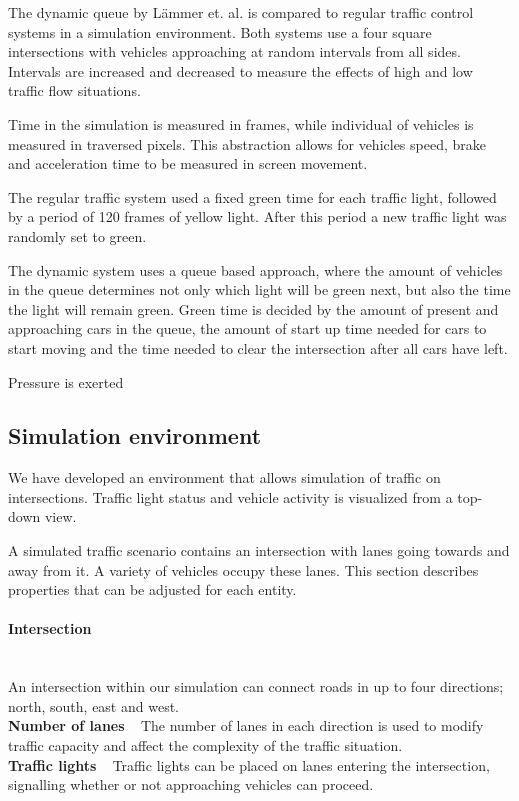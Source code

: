 \documentclass{article}
\begin{document}
The dynamic queue by L{\"a}mmer et. al. is compared to regular traffic control systems in a simulation environment. Both systems use a four square intersections with vehicles approaching at random intervals from all sides. Intervals are increased and decreased to measure the effects of high and low traffic flow situations. 

Time in the simulation is measured in frames, while individual of vehicles is measured in traversed pixels. This abstraction allows for vehicles speed, brake and acceleration time to be measured in screen movement.

The regular traffic system used a fixed green time for each traffic light, followed by a period of 120 frames of yellow light. After this period a new traffic light was randomly set to green.

The dynamic system uses a queue based approach, where the amount of vehicles in the queue determines not only which light will be green next, but also the time the light will remain green. Green time is decided by the amount of present and approaching cars in the queue, the amount of start up time needed for cars to start moving and the time needed to clear the intersection after all cars have left. 

Pressure is exerted 


\subsection{Simulation environment}
We have developed an environment that allows simulation of traffic on intersections. Traffic light status and vehicle activity is visualized from a top-down view.

A simulated traffic scenario contains an intersection with lanes going towards and away from it. A variety of vehicles occupy these lanes. This section describes properties that can be adjusted for each entity.

\paragraph{Intersection} ~\\
An intersection within our simulation can connect roads in up to four directions; north, south, east and west. \\
\textbf{Number of lanes} ~ The number of lanes in each direction is used to modify traffic capacity and affect the complexity of the traffic situation.\\
\textbf{Traffic lights} ~ Traffic lights can be placed on lanes entering the intersection, signalling whether or not approaching vehicles can proceed.
\end{document}
